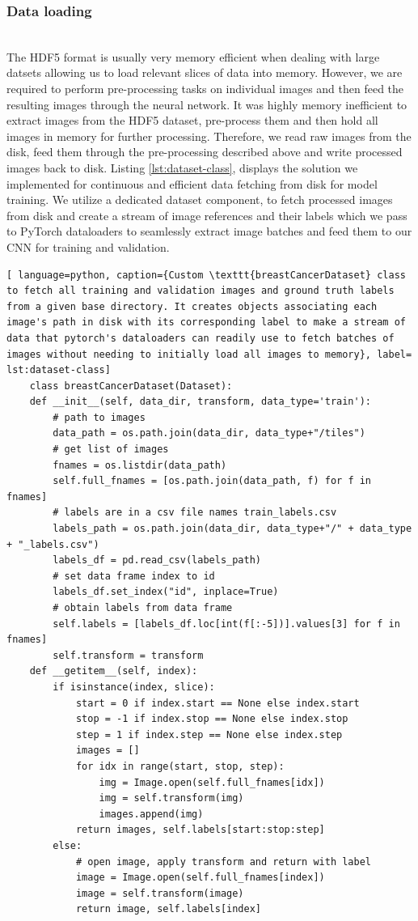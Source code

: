 \documentclass{l4proj}
\begin{document}
\subsubsection{Data loading}\hfill\\
The HDF5 format is usually very memory efficient when dealing with large datsets allowing us to load relevant slices of data into memory. However, we are required to perform pre-processing tasks on individual images and then feed the resulting images through the neural network. It was highly memory inefficient to extract images from the HDF5 dataset, pre-process them and then hold all images in memory for further processing. Therefore, we read raw images from the disk, feed them through the pre-processing described above and write processed images back to disk. Listing \ref{lst:dataset-class}, displays the solution we implemented for continuous and efficient data fetching from disk for model training. We utilize a dedicated dataset component, to fetch processed images from disk and create a stream of image references and their labels which we pass to PyTorch dataloaders to seamlessly extract image batches and feed them to our CNN for training and validation. 

\begin{lstlisting}[ language=python, caption={Custom \texttt{breastCancerDataset} class to fetch all training and validation images and ground truth labels from a given base directory. It creates objects associating each image's path in disk with its corresponding label to make a stream of data that pytorch's dataloaders can readily use to fetch batches of images without needing to initially load all images to memory}, label= lst:dataset-class]
    class breastCancerDataset(Dataset):
    def __init__(self, data_dir, transform, data_type='train'):
        # path to images
        data_path = os.path.join(data_dir, data_type+"/tiles")
        # get list of images
        fnames = os.listdir(data_path)
        self.full_fnames = [os.path.join(data_path, f) for f in fnames]
        # labels are in a csv file names train_labels.csv
        labels_path = os.path.join(data_dir, data_type+"/" + data_type + "_labels.csv")
        labels_df = pd.read_csv(labels_path)
        # set data frame index to id
        labels_df.set_index("id", inplace=True)
        # obtain labels from data frame
        self.labels = [labels_df.loc[int(f[:-5])].values[3] for f in fnames]
        self.transform = transform
    def __getitem__(self, index):
        if isinstance(index, slice):
            start = 0 if index.start == None else index.start
            stop = -1 if index.stop == None else index.stop
            step = 1 if index.step == None else index.step
            images = []
            for idx in range(start, stop, step):
                img = Image.open(self.full_fnames[idx])
                img = self.transform(img)
                images.append(img)
            return images, self.labels[start:stop:step]
        else:
            # open image, apply transform and return with label
            image = Image.open(self.full_fnames[index])
            image = self.transform(image)
            return image, self.labels[index]
\end{lstlisting}
\end{document}
